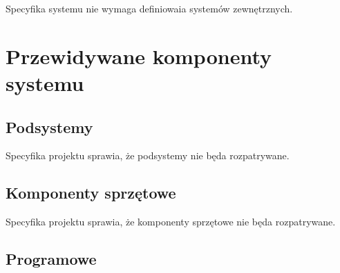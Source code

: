 \documentclass[a4paper,10pt]{article}
\begin{document}
Specyfika systemu nie wymaga definiowaia systemów zewnętrznych.




\section{Przewidywane komponenty systemu}


\subsection{Podsystemy}
Specyfika projektu sprawia, że podsystemy nie będa rozpatrywane.

\subsection{Komponenty sprzętowe}
Specyfika projektu sprawia, że komponenty sprzętowe nie będa rozpatrywane.

\subsection{Programowe}
\end{document}
